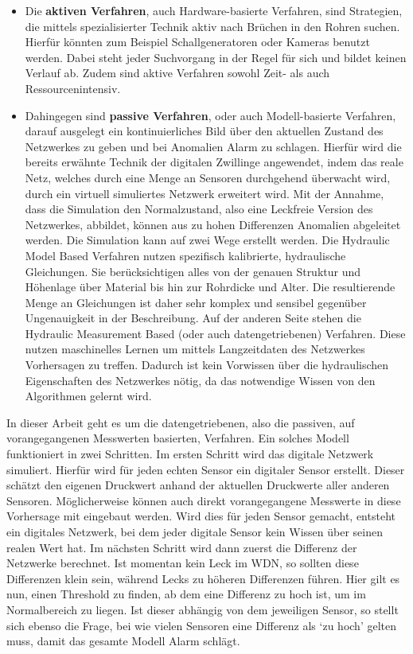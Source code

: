 \begin{itemize}
    
    \item Die \textbf{aktiven Verfahren}, auch Hardware-basierte Verfahren, sind Strategien, die mittels
     spezialisierter Technik aktiv nach Brüchen in den Rohren suchen. Hierfür könnten zum Beispiel
     Schallgeneratoren oder Kameras benutzt werden. Dabei steht jeder Suchvorgang in der Regel für sich
     und bildet keinen Verlauf ab. Zudem sind aktive Verfahren sowohl Zeit- als auch Ressourcenintensiv.

    \item Dahingegen sind \textbf{passive Verfahren}, oder auch Modell-basierte Verfahren, darauf ausgelegt
     ein kontinuierliches Bild über den aktuellen Zustand des Netzwerkes zu geben und bei Anomalien Alarm zu
     schlagen. Hierfür wird die bereits erwähnte Technik der digitalen Zwillinge angewendet, indem das reale
     Netz, welches durch eine Menge an Sensoren durchgehend überwacht wird, durch ein virtuell simuliertes
     Netzwerk erweitert wird. Mit der Annahme, dass die Simulation den Normalzustand, also eine Leckfreie
     Version des Netzwerkes, abbildet, können aus zu hohen Differenzen Anomalien abgeleitet werden. Die
     Simulation kann auf zwei Wege erstellt werden. Die Hydraulic Model Based Verfahren nutzen spezifisch
     kalibrierte, hydraulische Gleichungen. Sie berücksichtigen alles von der genauen Struktur und Höhenlage
     über Material bis hin zur Rohrdicke und Alter. Die resultierende Menge an Gleichungen ist daher sehr
     komplex und sensibel gegenüber Ungenauigkeit in der Beschreibung. Auf der anderen Seite stehen die
     Hydraulic Measurement Based (oder auch datengetriebenen) Verfahren. Diese nutzen maschinelles Lernen um
     mittels Langzeitdaten des Netzwerkes Vorhersagen zu treffen. Dadurch ist kein Vorwissen über die
     hydraulischen Eigenschaften des Netzwerkes nötig, da das notwendige Wissen von den Algorithmen gelernt wird.
    
\end{itemize}

In dieser Arbeit geht es um die datengetriebenen, also die passiven, auf vorangegangenen Messwerten
 basierten, Verfahren. Ein solches Modell funktioniert in zwei Schritten. Im ersten Schritt wird das
 digitale Netzwerk simuliert. Hierfür wird für jeden echten Sensor ein digitaler Sensor erstellt. Dieser
 schätzt den eigenen Druckwert anhand der aktuellen Druckwerte aller anderen Sensoren. Möglicherweise können
 auch direkt vorangegangene Messwerte in diese Vorhersage mit eingebaut werden. Wird dies für jeden Sensor
 gemacht, entsteht ein digitales Netzwerk, bei dem jeder digitale Sensor kein Wissen über seinen realen Wert
 hat. Im nächsten Schritt wird dann zuerst die Differenz der Netzwerke berechnet. Ist momentan kein Leck im
 WDN, so sollten diese Differenzen klein sein, während Lecks zu höheren Differenzen führen. Hier gilt es nun,
 einen Threshold zu finden, ab dem eine Differenz zu hoch ist, um im Normalbereich zu liegen. Ist dieser
 abhängig von dem jeweiligen Sensor, so stellt sich ebenso die Frage, bei wie vielen Sensoren eine Differenz
 als ‘zu hoch’ gelten muss, damit das gesamte Modell Alarm schlägt.

